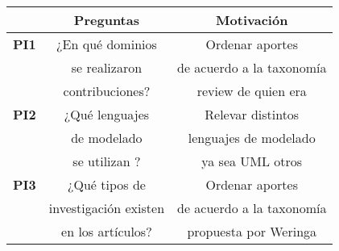 \documentclass[runningheads,a4paper,spanish]{llncs}
\begin{document}
\begin{table}[ht]
    \centering
    \begin{tabular}{| c | c | c |}
    \hline
    & Preguntas & Motivación \\ 
    \hline
    \textbf{PI1} & ¿En qué dominios      & Ordenar aportes \\
                 & se realizaron         & de acuerdo a la taxonomía \\ 
                 & contribuciones?       & review de quien era\\
    \hline
    \textbf{PI2} & ¿Qué lenguajes        & Relevar distintos\\
                 & de modelado           & lenguajes de modelado \\ 
                 & se utilizan ?         & ya sea UML otros\\
    \hline
    \textbf{PI3} & ¿Qué tipos de         & Ordenar aportes \\
                 & investigación existen & de acuerdo a la taxonomía \\ 
                 & en los artículos?     & propuesta por Weringa \\
    \hline
  \end{tabular}
  \end{table}


\end{document}
